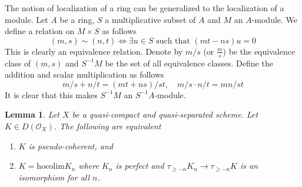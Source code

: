 \documentclass{amsart}
\theoremstyle{plain}
\newtheorem{lemma}[subsection]{Lemma}
\theoremstyle{definition}
\theoremstyle{remark}
\numberwithin{equation}{subsection}
\begin{document}
\noindent
The notion of localization of a ring can be generalized to the
localization of a module. Let $A$ be a ring, $S$ a multiplicative
subset of $A$ and $M$ an $A$-module. We define a relation on
$M \times S$ as follows
$$
(m, s) \sim (n, t)
\Leftrightarrow
\exists u\in S \text{ such that } (mt-ns)u = 0
$$
This is clearly an equivalence relation. Denote by $m/s$ (or
$\frac{m}{s}$) be the equivalence class of $(m, s)$ and $S^{-1}M$ be
the set of all equivalence classes. Define the addition and scalar
multiplication as follows
$$
m/s + n/t = (mt + ns)/st,\quad
m/s\cdot n/t = mn/st
$$
It is clear that this makes $S^{-1}M$ an $S^{-1}A$-module.


\begin{lemma}
\label{lemma-pseudo-coherent-hocolim}
Let $X$ be a quasi-compact and quasi-separated scheme.
Let $K \in D(\mathcal{O}_X)$. The following are equivalent
\begin{enumerate}
\item $K$ is pseudo-coherent, and
\item $K = \text{hocolim} K_n$ where
$K_n$ is perfect and $\tau_{\geq -n}K_n \to \tau_{\geq -n}K$
is an isomorphism for all $n$.
\end{enumerate}
\end{lemma}
\end{document}
